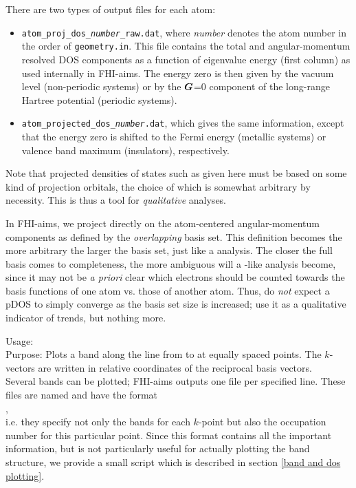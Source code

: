 There are two types of output files for each atom:
\begin{itemize}
  \item \texttt{atom\_proj\_dos\_\emph{number}\_raw.dat}, where \emph{number}
    denotes the atom number in the order of \texttt{geometry.in}. This file
    contains the total and angular-momentum resolved DOS components as a
    function of eigenvalue energy (first column) as used internally in
    FHI-aims. The energy zero is then given by the vacuum level (non-periodic
    systems) or by the $\mbox{\boldmath$G$}$=0 component of the long-range Hartree
    potential (periodic systems).
  \item \texttt{atom\_projected\_dos\_\emph{number}.dat}, which gives the same
    information, except that the energy zero is shifted to the Fermi energy
    (metallic systems) or valence band maximum (insulators), respectively.
\end{itemize}
Note that projected densities of states such as given here must be
based on some kind of projection orbitals, the choice of which is
somewhat arbitrary by necessity. This is thus a tool for
\emph{qualitative} analyses.

In FHI-aims, we project directly on
the atom-centered angular-momentum components as defined by the
\emph{overlapping} basis set. This definition becomes the more arbitrary the
larger the basis set, just like a 
analysis. The closer the full basis comes to completeness, the
more ambiguous will a -like analysis become,
since it may not be \emph{a priori} clear which electrons should be counted
towards the basis functions of one atom vs. those of another atom. Thus, do
\emph{not} expect a pDOS to simply converge as the basis set size is
increased; use it as a qualitative indicator of trends, but nothing more. 


{
  \noindent
  Usage:   \\[1.0ex] 
  Purpose: Plots a band along the line from
     to 
   at  equally
  spaced points. The $k$-vectors are written in relative
  coordinates of the reciprocal basis vectors. \\
}
Several bands can be plotted; FHI-aims outputs one file
per specified  line. These files are named
 and have the format\\[1.0ex]
, \\[1.0ex]
i.e. they specify not only the bands for each $k$-point but also
the occupation number for this particular point. 
Since this format contains all the important information, 
but is not particularly useful for actually plotting the band 
structure, we provide a small script which is described in
section \ref{band and dos plotting}.

